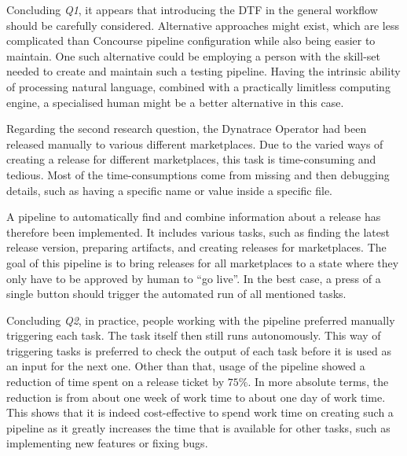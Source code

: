 Concluding \textit{Q1}, it appears that introducing the DTF in the general workflow should be carefully considered.
Alternative approaches might exist, which are less complicated than Concourse pipeline configuration while also being easier to maintain.
One such alternative could be employing a person with the skill-set needed to create and maintain such a testing pipeline.
Having the intrinsic ability of processing natural language, combined with a practically limitless computing engine, a specialised human might be a better alternative in this case.

Regarding the second research question, the Dynatrace Operator had been released manually to various different marketplaces.
Due to the varied ways of creating a release for different marketplaces, this task is time-consuming and tedious.
Most of the time-consumptions come from missing and then debugging details, such as having a specific name or value inside a specific file.

A pipeline to automatically find and combine information about a release has therefore been implemented.
It includes various tasks, such as finding the latest release version, preparing artifacts, and creating releases for marketplaces.
The goal of this pipeline is to bring releases for all marketplaces to a state where they only have to be approved by human to ``go live''.
In the best case, a press of a single button should trigger the automated run of all mentioned tasks.

Concluding \textit{Q2}, in practice, people working with the pipeline preferred manually triggering each task.
The task itself then still runs autonomously.
This way of triggering tasks is preferred to check the output of each task before it is used as an input for the next one.
Other than that, usage of the pipeline showed a reduction of time spent on a release ticket by $75 \%$.
In more absolute terms, the reduction is from about one week of work time to about one day of work time.
This shows that it is indeed cost-effective to spend work time on creating such a pipeline as it greatly increases the time that is available for other tasks, such as implementing new features or fixing bugs.
